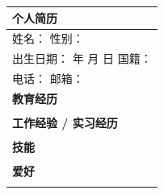 \documentclass[11pt]{article}
\begin{document}
\begin{textebox}
\begin{tabularx}{\linewidth}{|X|}
\hline
\rowcolor{popblueL} \textbf{个人简历} \\
\hline
姓名：\underline{\hspace{4cm}} \quad 性别：\underline{\hspace{2cm}} \\
\hline
出生日期：\underline{\hspace{3cm}} 年 \underline{\hspace{1cm}} 月 \underline{\hspace{1cm}} 日 \quad 国籍：\underline{\hspace{2cm}} \\
\hline
电话：\underline{\hspace{5cm}} \quad 邮箱：\underline{\hspace{5cm}} \\
\hline
\rowcolor{poppurpleL} \textbf{教育经历} \\
\hline
\underline{\hspace{16cm}} \\
\hline
\rowcolor{poppurpleL} \textbf{工作经验 / 实习经历} \\
\hline
\underline{\hspace{16cm}} \\
\hline
\rowcolor{poppurpleL} \textbf{技能} \\
\hline
\underline{\hspace{16cm}} \\
\hline
\rowcolor{poppurpleL} \textbf{爱好} \\
\hline
\underline{\hspace{16cm}} \\
\hline
\end{tabularx}
\end{textebox}
\end{document}
